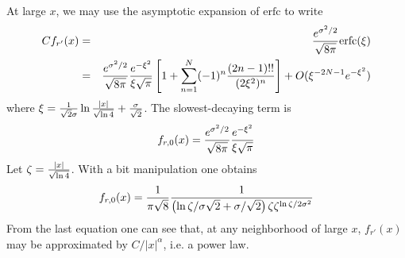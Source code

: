 \documentclass{book}
\begin{document}
At large $x$, we may use the asymptotic expansion of $\mathrm{erfc}$
to write
\begin{eqnarray*}
  Cf_{r'}(x) &=& {e^{\sigma^2 / 2} \over \sqrt{8\pi}} \mathrm{erfc}(\xi) \\
  &=& {e^{\sigma^2 / 2} \over \sqrt{8 \pi}}
  \frac{e^{-\xi^2}}{\xi\sqrt{\pi}}\left[
    1 +
    \sum_{n=1}^N (-1)^n \frac{(2n-1)!!}{(2\xi^2)^n} \right] +
  O(\xi^{-2N-1} e^{-\xi^2})
\end{eqnarray*}
where $\xi = {1 \over \sqrt{2}\sigma} \ln{|x| \over \sqrt{\ln 4}} +
{\sigma \over \sqrt{2}}$. The slowest-decaying term is
\[
f_{r,0}(x) = {e^{\sigma^2 / 2} \over \sqrt{8\pi}}
\frac{e^{-\xi^2}}{\xi\sqrt{\pi}}
\]
Let $\zeta = {|x| \over \sqrt{\ln 4}}$. With a bit manipulation one
obtains
\begin{equation}
  f_{r,0}(x) = {1 \over \pi \sqrt{8}}{1 \over
    \left(\ln\zeta/\sigma\sqrt{2} +
      \sigma/\sqrt{2}\right)\zeta\zeta^{\ln \zeta / 2\sigma^2}
  }
\end{equation}
From the last equation one can see that, at any neighborhood of large
$x$, $f_{r'}(x)$ may be approximated by $C/|x|^\alpha$, i.e. a power law.
\end{document}
